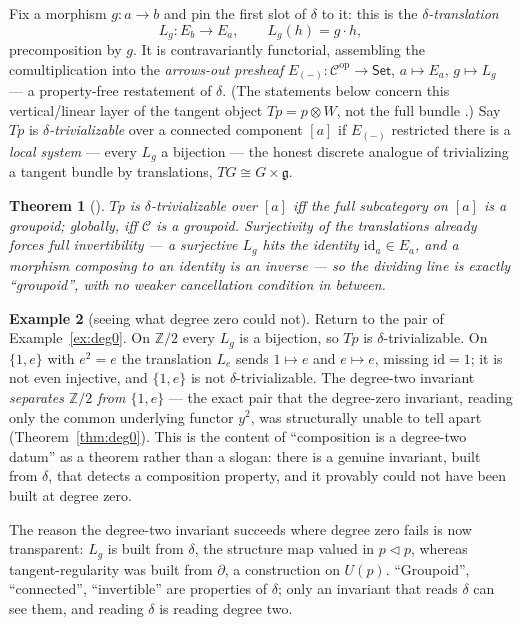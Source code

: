 \documentclass[11pt]{article}
\newtheorem{theorem}{Theorem}
\theoremstyle{definition}
\newtheorem{example}[theorem]{Example}
\newcommand{\Set}{\mathsf{Set}}
\newcommand{\Z}{\mathbb{Z}}
\newcommand{\id}{\mathrm{id}}
\newcommand{\cC}{\mathcal{C}}
\newcommand{\lto}{\!\lhd\!}
\begin{document}
Fix a morphism $g\colon a\to b$ and pin the first slot of $\delta$ to it: this is the
\emph{$\delta$-translation}
\[
   L_g\colon E_b\to E_a,\qquad L_g(h)=g\cdot h ,
\]
precomposition by $g$. It is contravariantly functorial, assembling the comultiplication into the
\emph{arrows-out presheaf} $E_{(-)}\colon\cC^{\mathrm{op}}\to\Set$, $a\mapsto E_a$, $g\mapsto L_g$
--- a property-free restatement of $\delta$. (The statements below concern this vertical/linear
layer of the tangent object $T p=p\otimes W$, not the full bundle \cite{MacBethDelta}.) Say $Tp$ is
\emph{$\delta$-trivializable} over a connected component $[a]$ if $E_{(-)}$ restricted there is a
\emph{local system} --- every $L_g$ a bijection --- the honest discrete analogue of trivializing a
tangent bundle by translations, $TG\cong G\times\mathfrak g$.

\begin{theorem}[\cite{MacBethDelta}]\label{thm:deg2}
$Tp$ is $\delta$-trivializable over $[a]$ iff the full subcategory on $[a]$ is a \emph{groupoid};
globally, iff $\cC$ is a groupoid. Surjectivity of the translations already forces full
invertibility --- a surjective $L_g$ hits the identity $\id_a\in E_a$, and a morphism composing to
an identity is an inverse --- so the dividing line is exactly ``groupoid'', with no weaker
cancellation condition in between.
\end{theorem}

\begin{example}[seeing what degree zero could not]\label{ex:deg2}
Return to the pair of Example~\ref{ex:deg0}. On $\Z/2$ every $L_g$ is a bijection, so $Tp$ is
$\delta$-trivializable. On $\{1,e\}$ with $e^2=e$ the translation $L_e$ sends $1\mapsto e$ and
$e\mapsto e$, missing $\id=1$; it is not even injective, and $\{1,e\}$ is not $\delta$-trivializable.
The degree-two invariant \emph{separates $\Z/2$ from $\{1,e\}$} --- the exact pair that the
degree-zero invariant, reading only the common underlying functor $y^2$, was structurally unable to
tell apart (Theorem~\ref{thm:deg0}). This is the content of ``composition is a degree-two datum'' as
a theorem rather than a slogan: there is a genuine invariant, built from $\delta$, that detects a
composition property, and it provably could not have been built at degree zero.
\end{example}

The reason the degree-two invariant succeeds where degree zero fails is now transparent: $L_g$ is
built from $\delta$, the structure map valued in $p\lto p$, whereas tangent-regularity was built
from $\partial$, a construction on $U(p)$. ``Groupoid'', ``connected'', ``invertible'' are
properties of $\delta$; only an invariant that reads $\delta$ can see them, and reading $\delta$ is
reading degree two.
\end{document}
